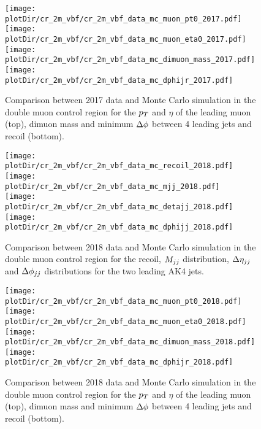 \begin{figure}[htbp]
    \begin{center}
        \texttt{[image: \\plotDir/cr\_2m\_vbf/cr\_2m\_vbf\_data\_mc\_muon\_pt0\_2017.pdf]}
        \texttt{[image: \\plotDir/cr\_2m\_vbf/cr\_2m\_vbf\_data\_mc\_muon\_eta0\_2017.pdf]}
        \texttt{[image: \\plotDir/cr\_2m\_vbf/cr\_2m\_vbf\_data\_mc\_dimuon\_mass\_2017.pdf]}
        \texttt{[image: \\plotDir/cr\_2m\_vbf/cr\_2m\_vbf\_data\_mc\_dphijr\_2017.pdf]}
    \end{center}
    \caption{Comparison between 2017 data and Monte Carlo simulation in the double muon control region for
        the $p_T$ and $\eta$ of the leading muon (top), dimuon mass and minimum $\Delta \phi$ between 4 leading jets and recoil (bottom).}
    \label{fig:cr_2m_vbf_2017_mtr_2}
\end{figure}

\begin{figure}[htbp]
    \begin{center}
        \texttt{[image: \\plotDir/cr\_2m\_vbf/cr\_2m\_vbf\_data\_mc\_recoil\_2018.pdf]}
        \texttt{[image: \\plotDir/cr\_2m\_vbf/cr\_2m\_vbf\_data\_mc\_mjj\_2018.pdf]} \\
        \texttt{[image: \\plotDir/cr\_2m\_vbf/cr\_2m\_vbf\_data\_mc\_detajj\_2018.pdf]}
        \texttt{[image: \\plotDir/cr\_2m\_vbf/cr\_2m\_vbf\_data\_mc\_dphijj\_2018.pdf]}
    \end{center}
    \caption{Comparison between 2018 data and Monte Carlo simulation in the double muon control region for
        the recoil, $M_{jj}$ distribution, $\Delta \eta_{jj}$ and $\Delta \phi_{jj}$ distributions for the two leading AK4 jets.}
    \label{fig:cr_2m_vbf_2018_mtr}
\end{figure}

\begin{figure}[htbp]
    \begin{center}
        \texttt{[image: \\plotDir/cr\_2m\_vbf/cr\_2m\_vbf\_data\_mc\_muon\_pt0\_2018.pdf]}
        \texttt{[image: \\plotDir/cr\_2m\_vbf/cr\_2m\_vbf\_data\_mc\_muon\_eta0\_2018.pdf]}
        \texttt{[image: \\plotDir/cr\_2m\_vbf/cr\_2m\_vbf\_data\_mc\_dimuon\_mass\_2018.pdf]}
        \texttt{[image: \\plotDir/cr\_2m\_vbf/cr\_2m\_vbf\_data\_mc\_dphijr\_2018.pdf]}
    \end{center}
    \caption{Comparison between 2018 data and Monte Carlo simulation in the double muon control region for
        the $p_T$ and $\eta$ of the leading muon (top), dimuon mass and minimum $\Delta \phi$ between 4 leading jets and recoil (bottom).}
    \label{fig:cr_2m_vbf_2018_mtr_2}
\end{figure}

